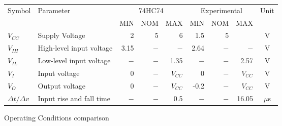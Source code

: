 \begin{tabular}{|l|l|r|r|r|r|r|r|c|}
    \toprule
    Symbol  &Parameter  &\multicolumn{3}{c|}{74HC74}&\multicolumn{3}{c|}{Experimental}&Unit\\
            &           &   MIN&NOM&MAX&MIN&NOM&MAX&\\
    \midrule
    $V_{CC}$&Supply Voltage&2&5&6&1.5&5&  &V\\
    $V_{IH}$&High-level input voltage&3.15&$-$&$-$&2.64&$-$&$-$&V\\
    $V_{IL}$&Low-level input voltage&$-$&$-$&1.35&$-$&$-$&2.57&V\\
    $V_{I}$ &Input voltage&0&$-$&$V_{CC}$&0&$-$&$V_{CC}$&V\\
    $V_{O}$ &Output voltage&0&$-$&$V_{CC}$&-0.2&$-$&$V_{CC}$&V\\
    $\Delta t / \Delta v$&  Input rise and fall time&$-$&$-$&0.5&$-$&$-$&16.05&$\mu$s\\
    \bottomrule
\end{tabular}
\caption{Operating Conditions comparison}